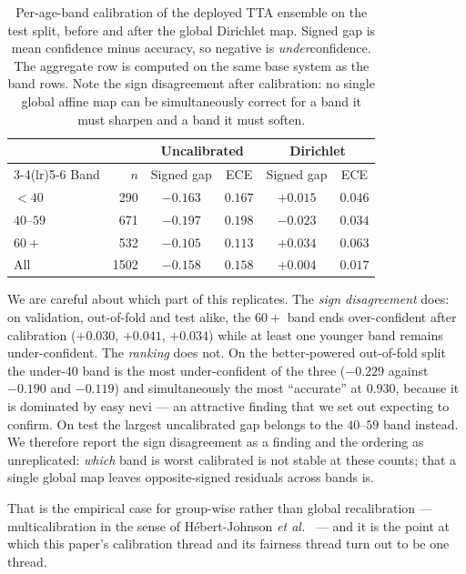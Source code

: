 \documentclass[journal]{IEEEtran}
\begin{document}
\begin{table}[t]
\centering
\caption{Per-age-band calibration of the deployed TTA ensemble on the test split, before and
after the global Dirichlet map. Signed gap is mean confidence minus accuracy, so negative is
\emph{under}confidence. The aggregate row is computed on the same base system as the band
rows. Note the sign disagreement after calibration: no single global affine map can be
simultaneously correct for a band it must sharpen and a band it must soften.}
\label{tab:bandcal}
\begin{tabular}{lrcccc}
\toprule
& & \multicolumn{2}{c}{Uncalibrated} & \multicolumn{2}{c}{Dirichlet} \\
\cmidrule(lr){3-4}\cmidrule(lr){5-6}
Band & $n$ & Signed gap & ECE & Signed gap & ECE \\
\midrule
$<40$      & 290  & $-0.163$ & $0.167$ & $+0.015$ & $0.046$ \\
$40$--$59$ & 671  & $-0.197$ & $0.198$ & $-0.023$ & $0.034$ \\
$60+$      & 532  & $-0.105$ & $0.113$ & $+0.034$ & $0.063$ \\
\midrule
All        & 1502 & $-0.158$ & $0.158$ & $+0.004$ & $0.017$ \\
\bottomrule
\end{tabular}
\end{table}

We are careful about which part of this replicates. The \emph{sign disagreement} does: on
validation, out-of-fold and test alike, the $60+$ band ends over-confident after calibration
($+0.030$, $+0.041$, $+0.034$) while at least one younger band remains under-confident. The
\emph{ranking} does not. On the better-powered out-of-fold split the under-$40$ band is the
most under-confident of the three ($-0.229$ against $-0.190$ and $-0.119$) and simultaneously
the most ``accurate'' at $0.930$, because it is dominated by easy nevi --- an attractive
finding that we set out expecting to confirm. On test the largest uncalibrated gap belongs to
the $40$--$59$ band instead. We therefore report the sign disagreement as a finding and the
ordering as unreplicated: \emph{which} band is worst calibrated is not stable at these
counts; that a single global map leaves opposite-signed residuals across bands is.

That is the empirical case for group-wise rather than global recalibration ---
multicalibration in the sense of H\'ebert-Johnson
\emph{et al.}~\cite{hebertjohnson2018multicalibration} --- and it is the point at which this
paper's calibration thread and its fairness thread turn out to be one thread.
\end{document}
